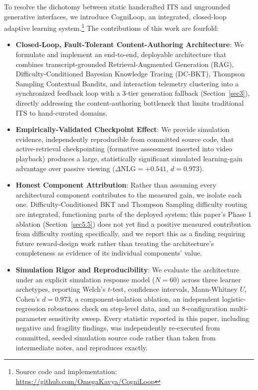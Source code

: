 \documentclass[pdflatex,sn-apa]{sn-jnl}
\begin{document}
To resolve the dichotomy between static handcrafted ITS and ungrounded generative interfaces, we introduce CogniLoop, an integrated, closed-loop adaptive learning system.\footnote{Source code and implementation: \url{https://github.com/OmegaKavya/CogniLoop}} The contributions of this work are fourfold:
\begin{itemize}
\item \textbf{Closed-Loop, Fault-Tolerant Content-Authoring Architecture}: We formulate and implement an end-to-end, deployable architecture that combines transcript-grounded Retrieval-Augmented Generation (RAG), Difficulty-Conditioned Bayesian Knowledge Tracing (DC-BKT), Thompson Sampling Contextual Bandits, and interaction telemetry clustering into a synchronized feedback loop with a 3-tier generation fallback (Section~\ref{sec3}), directly addressing the content-authoring bottleneck that limits traditional ITS to hand-curated domains.
\item \textbf{Empirically-Validated Checkpoint Effect}: We provide simulation evidence, independently reproducible from committed source code, that active-retrieval checkpointing (formative assessment inserted into video playback) produces a large, statistically significant simulated learning-gain advantage over passive viewing ($\Delta\text{NLG}=+0.541$, $d=0.973$).
\item \textbf{Honest Component Attribution}: Rather than assuming every architectural component contributes to the measured gain, we isolate each one. Difficulty-Conditioned BKT and Thompson Sampling difficulty routing are integrated, functioning parts of the deployed system; this paper's Phase 1 ablation (Section~\ref{sec5.5}) does not yet find a positive measured contribution from difficulty routing specifically, and we report this as a finding requiring future reward-design work rather than treating the architecture's completeness as evidence of its individual components' value.
\item \textbf{Simulation Rigor and Reproducibility}: We evaluate the architecture under an explicit simulation response model ($N=60$) across three learner archetypes, reporting Welch's $t$-test, confidence intervals, Mann-Whitney $U$, Cohen's $d=0.973$, a component-isolation ablation, an independent logistic-regression robustness check on step-level data, and an 8-configuration multi-parameter sensitivity sweep. Every statistic reported in this paper, including negative and fragility findings, was independently re-executed from committed, seeded simulation source code rather than taken from intermediate notes, and reproduces exactly.
\end{itemize}
\end{document}
